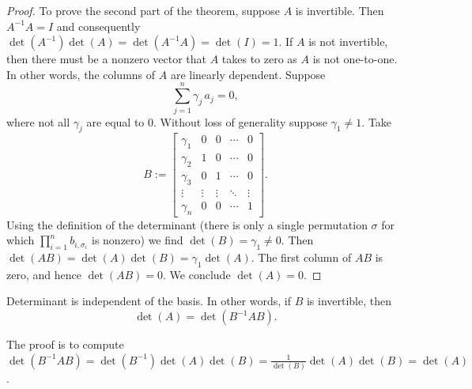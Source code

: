 \begin{proof}
To prove the second part of the theorem, suppose $A$ is invertible.
Then $A^{-1}A = I$ and consequently $\det(A^{-1})\det(A) = \det(A^{-1}A) = \det(I) = 1$.
If $A$ is not invertible, then there must be a nonzero vector that $A$ takes
to zero as $A$ is not one-to-one.  In other words, the columns of $A$ are linearly dependent.
Suppose 
\begin{equation*}
\sum_{j=1}^n \gamma_j\, a_j = 0 ,
\end{equation*}
where not all $\gamma_j$ are equal to 0.
Without loss of generality suppose $\gamma_1\neq 1$.
Take
\begin{equation*}
B := 
\begin{bmatrix}
\gamma_1 & 0 & 0 & \cdots & 0 \\
\gamma_2 & 1 & 0 & \cdots & 0 \\
\gamma_3 & 0 & 1 & \cdots & 0 \\
\vdots & \vdots & \vdots & \ddots & \vdots \\
\gamma_n & 0 & 0 & \cdots & 1
\end{bmatrix} .
\end{equation*}
Using the definition of the determinant (there is only a single
permutation $\sigma$ for which $\prod_{i=1}^n b_{i,\sigma_i}$ is nonzero)
we find $\det(B) = \gamma_1 \not= 0$.
Then
$\det(AB) = \det(A)\det(B) = \gamma_1\det(A)$.
The first column of $AB$ is zero, and hence $\det(AB) = 0$.  We conclude
$\det(A) = 0$.
\end{proof}

\begin{prop}
Determinant is independent of the basis.  In other words, if $B$ is
invertible, then
\begin{equation*}
\det(A) = \det(B^{-1}AB) .
\end{equation*}
\end{prop}

The proof is to compute
$\det(B^{-1}AB) = 
\det(B^{-1})\det(A)\det(B) =
\frac{1}{\det(B)}\det(A)\det(B) = \det(A)$.

